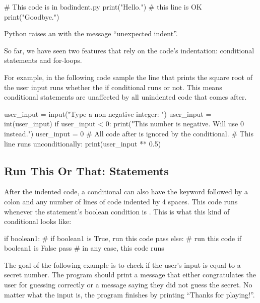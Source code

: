 \documentclass[11pt]{cselabheader}
\begin{document}
\begin{python3code}
# This code is in badindent.py
print("Hello.") # this line is OK
    print("Goodbye.")
\end{python3code}


Python raises an  with the message
``unexpected indent''.

So far, we have seen two features that rely on the code's indentation:
conditional statements and for-loops.

For example, in the following code sample the line that prints the
square root of the user input runs whether the if conditional runs or
not. This means conditional statements are unaffected by all unindented code
that comes after.

\begin{python3code}
user_input = input("Type a non-negative integer: ")
user_input = int(user_input)
if user_input < 0:
    print("This number is negative. Will use 0 instead.")
    user_input = 0
# All code after is ignored by the conditional.
# This line runs unconditionally:
print(user_input ** 0.5)
\end{python3code}


\subsection{Run This Or That:  Statements}

After the indented code, a conditional can also have the keyword
 followed by a colon and any number of lines of
code indented by 4 spaces.  This code runs whenever the
 statement's boolean condition is
.
This is what this kind of conditional looks like:

\begin{python3code}
if boolean1:
    # if boolean1 is True, run this code
    pass
else:
    # run this code if boolean1 is False
    pass
# in any case, this code runs
\end{python3code}

The goal of the following example is to check if the user's input is
equal to a secret number. The program should print a message that
either congratulates the user for guessing correctly or a message
saying they did not guess the secret. No matter what the input is, the
program finishes by printing ``Thanks for playing!''.
\end{document}
